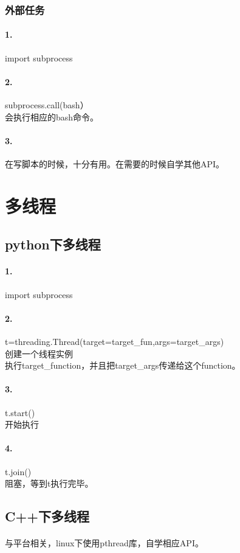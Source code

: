 \documentclass[12pt]{article}
\begin{document}
\begin{CJK}{UTF8}{gbsn}
\subsubsection{外部任务}
\paragraph{1.}import subprocess
\paragraph{2.}subprocess.call(bash）
\\会执行相应的bash命令。
\paragraph{3.}在写脚本的时候，十分有用。在需要的时候自学其他API。

\section{多线程}
\subsection{python下多线程}
\paragraph{1.}import subprocess
\paragraph{2.}t=threading.Thread(target=target\_fun,args=target\_args)
\\创建一个线程实例
\\执行target\_function，并且把target\_args传递给这个function。
\paragraph{3.}t.start()
\\开始执行
\paragraph{4.}t.join()
\\阻塞，等到t执行完毕。

\subsection{C++下多线程}
\paragraph{}与平台相关，linux下使用pthread库，自学相应API。

\end{CJK}
\end{document}
